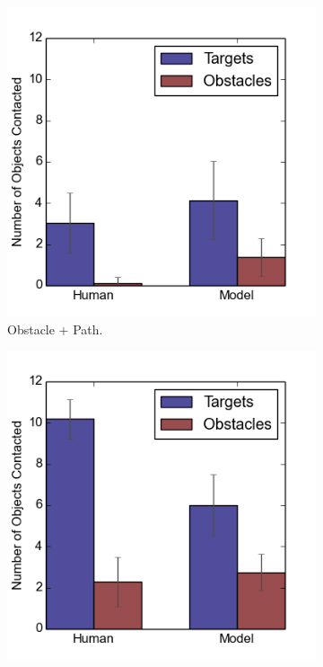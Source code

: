 \begin{figure}[h]
\begin{subfigure}[b]{0.24\textwidth}
\includegraphics[width=\textwidth]{contact2.png}
\caption{Obstacle + Path. }
\end{subfigure}
\begin{subfigure}[b]{0.24\textwidth}
\includegraphics[width=\textwidth]{contact3.png}

\end{subfigure}
\end{figure}
